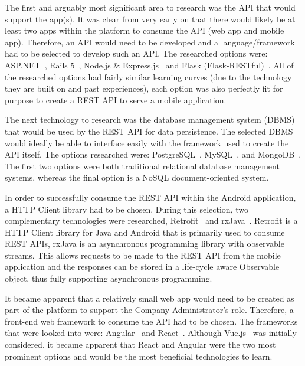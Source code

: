 The first and arguably most significant area to research was the API that would support the app(s). It was clear from very early on that there would likely be at least two apps within the platform to consume the API (web app and mobile app).  Therefore, an API would need to be developed and a language/framework had to be selected to develop such an API. The researched options were: ASP.NET~\cite{dotnet_documentation_ref}, Rails 5~\cite{rails_documentation_ref}, Node.js \& Express.js~\cite{nodejs_documentation_ref, expressjs_documentation_ref} and Flask (Flask-RESTful)~\cite{flask_documentation_ref}. All of the researched options had fairly similar learning curves (due to the technology they are built on and past experiences), each option was also perfectly fit for purpose to create a REST API  to serve a mobile application.

The next technology to research was the database management system (DBMS) that would be used by the REST API for data persistence. The selected DBMS would ideally be able to interface easily with the framework used to create the API itself. The options researched were: PostgreSQL~\cite{postgres_documentation_ref}, MySQL~\cite{mysql_documentation_ref}, and MongoDB~\cite{mongodb_documentation_ref}. The first two options were both traditional relational database management systems, whereas the final option is a NoSQL document-oriented system.

In order to successfully consume the REST API within the Android application, a HTTP Client library had to be chosen. During this selection, two complementary technologies were researched, Retrofit~\cite{retrofit_documentation_ref} and rxJava~\cite{rxjava_documentation_ref}. Retrofit is a HTTP Client library for Java and Android that is primarily used to consume REST APIs, rxJava is an asynchronous programming library with observable streams. This allows requests to be made to the REST API from the mobile application and the responses can be stored in a life-cycle aware Observable object, thus fully supporting asynchronous programming.

It became apparent that a relatively small web app would need to be created as part of the platform to support the Company Administrator's role. Therefore, a front-end web framework to consume the API had to be chosen. The frameworks that were looked into were: Angular~\cite{angular_documentation_ref} and React~\cite{react_documentation_ref}. Although Vue.js~\cite{vue_documentation_ref} was initially considered, it became apparent that React and Angular were the two most prominent options and would be the most beneficial technologies to learn.

